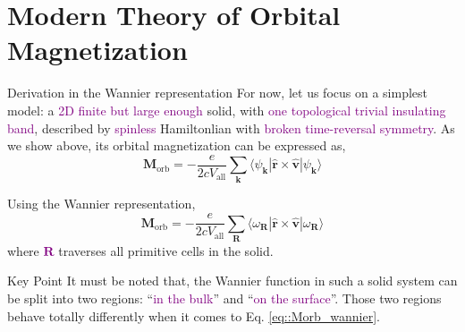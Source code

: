 \documentclass{beamer}
\newcommand{\purple}{\textcolor{purple}}
\begin{document}

    \section{Modern Theory of Orbital Magnetization}

    \begin{frame}{Derivation in the Wannier representation}
      \small
      For now, let us focus on a simplest model: a \purple{2D finite but large enough} solid, with \purple{one topological  trivial insulating band}, described by \purple{spinless} Hamiltonlian with \purple{broken time-reversal symmetry}. As we show above, its orbital magnetization can be expressed as,
      \begin{equation}
        \bm{M}_{\text{orb}} = -\frac{e}{2cV_{\text{all}}}\sum_{\bm{k}} \langle\psi_{\bm{k}}|\widehat{\bm{r}}\times\widehat{\bm{v}}|\psi_{\bm{k}}\rangle
      \end{equation}

      Using the Wannier representation, 
      \begin{equation}
        \label{eq::Morb_wannier}
        \bm{M}_{\text{orb}} = -\frac{e}{2cV_{\text{all}}}\sum_{\bm{R}} \langle\omega_{\bm{R}}|\widehat{\bm{r}}\times\widehat{\bm{v}}|\omega_{\bm{R}}\rangle
      \end{equation}
      where \purple{\(\bm{R}\)} traverses all primitive cells in the solid.
      \begin{block}{Key Point}
        It must be noted that, the Wannier function in such a solid system can be split into two regions: ``\purple{in the bulk}'' and ``\purple{on the surface}''. Those two regions behave totally differently when it comes to Eq. \eqref{eq::Morb_wannier}.
      \end{block}
    \end{frame}
\end{document}
